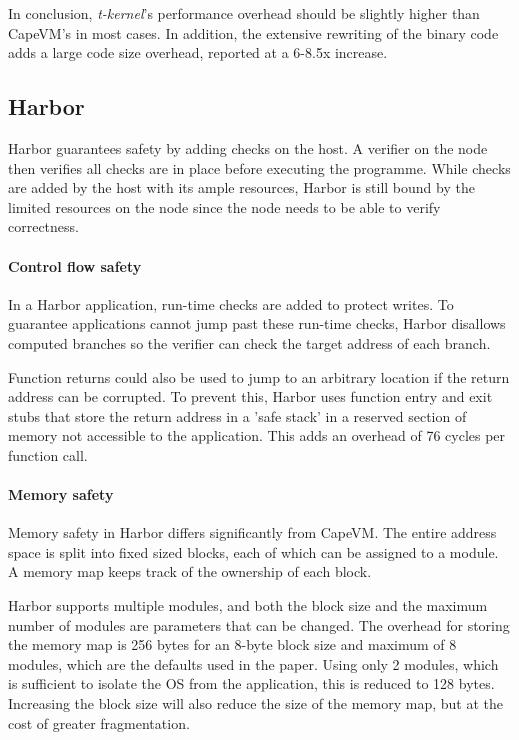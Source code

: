 In conclusion, \emph{t-kernel}'s performance overhead should be slightly higher than CapeVM's in most cases. In addition, the extensive rewriting of the binary code adds a large code size overhead, reported at a 6-8.5x increase.




\subsection{Harbor}
Harbor guarantees safety by adding checks on the host. A verifier on the node then verifies all checks are in place before executing the programme. While checks are added by the host with its ample resources, Harbor is still bound by the limited resources on the node since the node needs to be able to verify correctness.

\paragraph{Control flow safety}
In a Harbor application, run-time checks are added to protect writes. To guarantee applications cannot jump past these run-time checks, Harbor disallows computed branches so the verifier can check the target address of each branch.

Function returns could also be used to jump to an arbitrary location if the return address can be corrupted. To prevent this, Harbor uses function entry and exit stubs that store the return address in a 'safe stack' in a reserved section of memory not accessible to the application. This adds an overhead of 76 cycles per function call.

\paragraph{Memory safety}
Memory safety in Harbor differs significantly from CapeVM. The entire address space is split into fixed sized blocks, each of which can be assigned to a module. A memory map keeps track of the ownership of each block.

Harbor supports multiple modules, and both the block size and the maximum number of modules are parameters that can be changed. The overhead for storing the memory map is 256 bytes for an 8-byte block size and maximum of 8 modules, which are the defaults used in the paper. Using only 2 modules, which is sufficient to isolate the OS from the application, this is reduced to 128 bytes. Increasing the block size will also reduce the size of the memory map, but at the cost of greater fragmentation.

